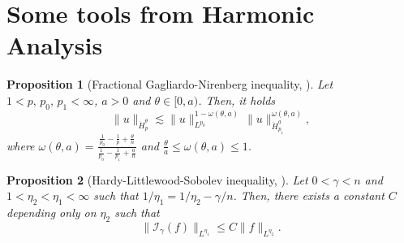 \documentclass[11pt,reqno]{amsart}
\newtheorem{proposition}{Proposition}[section]
\begin{document}
\appendix

\section{Some tools from Harmonic Analysis}

\begin{proposition}[Fractional Gagliardo-Nirenberg inequality, \cite{Hajaiej2011}]\label{fractionalgagliardonirenbergineq} 
Let $1<p,\,p_0,\,p_1<\infty$, $a >0$ and $\theta\in [0,a)$. Then, it holds
$$ \|u\|_{\dot{H}^{\theta}_p} \lesssim \|u\|_{L^{p_0}}^{1-\omega(\theta,a)}\, \|u\|_{\dot{H}^{a}_{p_1}}^{\omega(\theta,a)}, $$
where $\omega(\theta,a) =\displaystyle\frac{\frac{1}{p_0}-\frac{1}{p}+\frac{\theta}{n}}{\frac{1}{p_0}-\frac{1}{p_1}+\frac{a}{n}}$ and $\displaystyle\frac{\theta}{a}\leq \omega(\theta,a) \leq 1$.
\end{proposition}
\begin{proposition}[Hardy-Littlewood-Sobolev inequality, \cite{Lieb1983}]\label{Hardy-Littlewood-Sobolev}
Let $0<\gamma<n$ and $1<\eta_2<\eta_1<\infty$ such that $1/\eta_1=1/\eta_2-\gamma/n$. Then, there exists a constant $C$ depending only on $\eta_2$ such that
$$
\|\mathcal{I}_\gamma(f)\|_{L^{\eta_1}}\leq C\|f\|_{L^{\eta_2}}.
$$
\end{proposition}
\end{document}
